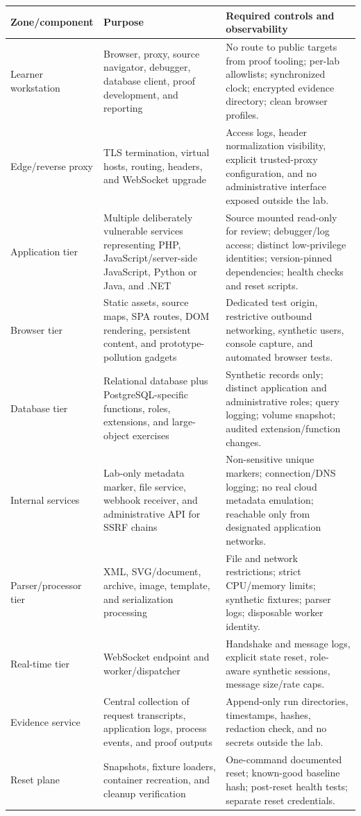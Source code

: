 \documentclass[11pt]{article}
\begin{document}
\begin{longtable}{@{}>{\raggedright\arraybackslash}p{}>{\raggedright\arraybackslash}p{}>{\raggedright\arraybackslash}p{}@{}}
\toprule
\textbf{Zone/\allowbreak component} & \textbf{Purpose} & \textbf{Required controls and observability} \\
\midrule
\endhead
Learner workstation & Browser, proxy, source navigator, debugger, database client, proof development, and reporting & No route to public targets from proof tooling; per-lab allowlists; synchronized clock; encrypted evidence directory; clean browser profiles. \\
Edge/reverse proxy & TLS termination, virtual hosts, routing, headers, and WebSocket upgrade & Access logs, header normalization visibility, explicit trusted-proxy configuration, and no administrative interface exposed outside the lab. \\
Application tier & Multiple deliberately vulnerable services representing PHP, JavaScript/server-side JavaScript, Python or Java, and .NET & Source mounted read-only for review; debugger/log access; distinct low-privilege identities; version-pinned dependencies; health checks and reset scripts. \\
Browser tier & Static assets, source maps, SPA routes, DOM rendering, persistent content, and prototype-pollution gadgets & Dedicated test origin, restrictive outbound networking, synthetic users, console capture, and automated browser tests. \\
Database tier & Relational database plus PostgreSQL-specific functions, roles, extensions, and large-object exercises & Synthetic records only; distinct application and administrative roles; query logging; volume snapshot; audited extension/function changes. \\
Internal services & Lab-only metadata marker, file service, webhook receiver, and administrative API for SSRF chains & Non-sensitive unique markers; connection/DNS logging; no real cloud metadata emulation; reachable only from designated application networks. \\
Parser/processor tier & XML, SVG/document, archive, image, template, and serialization processing & File and network restrictions; strict CPU/memory limits; synthetic fixtures; parser logs; disposable worker identity. \\
Real-time tier & WebSocket endpoint and worker/dispatcher & Handshake and message logs, explicit state reset, role-aware synthetic sessions, message size/rate caps. \\
Evidence service & Central collection of request transcripts, application logs, process events, and proof outputs & Append-only run directories, timestamps, hashes, redaction check, and no secrets outside the lab. \\
Reset plane & Snapshots, fixture loaders, container recreation, and cleanup verification & One-command documented reset; known-good baseline hash; post-reset health tests; separate reset credentials. \\
\bottomrule
\end{longtable}
\end{document}
